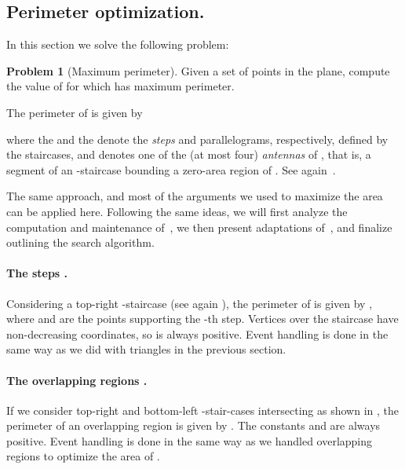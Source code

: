\documentclass[11pt,letterpaper,english]{article}
\theoremstyle{definition}
\newtheorem{problem}{Problem}
\begin{document}
\subsection{Perimeter optimization.}\label{sec:apps:perimeter}

In this section we solve the following problem:

\begin{problem}[Maximum perimeter]
  Given a set  of  points in the plane, compute the value of
   for which  has maximum perimeter.
\end{problem}

\noindent The perimeter of  is given by

where the  and the  denote the \emph{steps}
 and parallelograms, respectively, defined
by the staircases, and  denotes one of the (at most four)
\emph{antennas} of , that is, a segment of an
-staircase bounding a zero-area region of .
See again~.

The same approach, and most of the arguments we used to maximize the
area can be applied here. Following the same ideas, we will first
analyze the computation and maintenance of~,
we then present adaptations of~, and
finalize outlining the search algorithm.

\paragraph{The steps .}

Considering a top-right -staircase (see again
), the perimeter of  is given
by , where  and
 are the points supporting the -th
step. Vertices over the staircase have non-decreasing  coordinates,
so  is always positive. Event handling is done in the same way as
we did with triangles in the previous section.



\paragraph{The overlapping regions .}

If we consider top-right and bottom-left -stair-cases
intersecting as shown in , the
perimeter of an overlapping region is given by
. The constants  and  are always
positive. Event handling is done in the same way as we handled
overlapping regions to optimize the area of .
\end{document}
